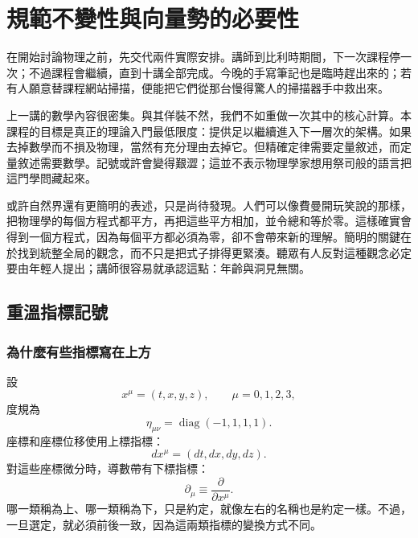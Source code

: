 \chapter{規範不變性與向量勢的必要性}

在開始討論物理之前，先交代兩件實際安排。講師到比利時期間，下一次課程停一次；不過課程會繼續，直到十講全部完成。今晚的手寫筆記也是臨時趕出來的；若有人願意替課程網站掃描，便能把它們從那台慢得驚人的掃描器手中救出來。

上一講的數學內容很密集。與其佯裝不然，我們不如重做一次其中的核心計算。本課程的目標是真正的理論入門最低限度：提供足以繼續進入下一層次的架構。如果去掉數學而不損及物理，當然有充分理由去掉它。但精確定律需要定量敘述，而定量敘述需要數學。記號或許會變得艱澀；這並不表示物理學家想用祭司般的語言把這門學問藏起來。

或許自然界還有更簡明的表述，只是尚待發現。人們可以像費曼開玩笑說的那樣，把物理學的每個方程式都平方，再把這些平方相加，並令總和等於零。這樣確實會得到一個方程式，因為每個平方都必須為零，卻不會帶來新的理解。簡明的關鍵在於找到統整全局的觀念，而不只是把式子排得更緊湊。聽眾有人反對這種觀念必定要由年輕人提出；講師很容易就承認這點：年齡與洞見無關。


\section{重溫指標記號}

\subsection{為什麼有些指標寫在上方}

設
\begin{equation}
x^\mu=(t,x,y,z),
\qquad
\mu=0,1,2,3,
\end{equation}
度規為
\begin{equation}
\eta_{\mu\nu}
=
\operatorname{diag}(-1,1,1,1).
\label{eq:sr7-metric}
\end{equation}
座標和座標位移使用上標指標：
\begin{equation}
dx^\mu=(dt,dx,dy,dz).
\end{equation}
對這些座標微分時，導數帶有下標指標：
\begin{equation}
\partial_\mu
\equiv
\frac{\partial}{\partial x^\mu}.
\label{eq:sr7-gradient}
\end{equation}
哪一類稱為上、哪一類稱為下，只是約定，就像左右的名稱也是約定一樣。不過，一旦選定，就必須前後一致，因為這兩類指標的變換方式不同。

